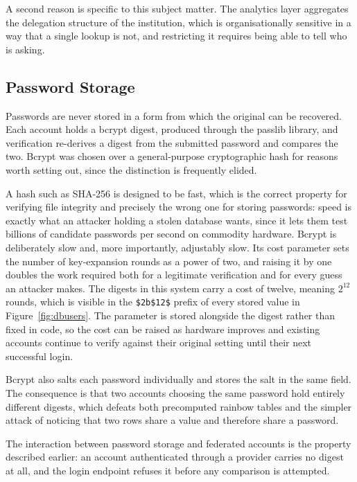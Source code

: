 A second reason is specific to this subject matter. The analytics layer aggregates the
delegation structure of the institution, which is organisationally sensitive in a way that a
single lookup is not, and restricting it requires being able to tell who is asking.

\subsection{Password Storage}

Passwords are never stored in a form from which the original can be recovered. Each account
holds a bcrypt digest, produced through the passlib library, and verification re-derives a
digest from the submitted password and compares the two. Bcrypt was chosen over a
general-purpose cryptographic hash for reasons worth setting out, since the distinction is
frequently elided.

A hash such as SHA-256 is designed to be fast, which is the correct property for verifying
file integrity and precisely the wrong one for storing passwords: speed is exactly what an
attacker holding a stolen database wants, since it lets them test billions of candidate
passwords per second on commodity hardware. Bcrypt is deliberately slow and, more
importantly, adjustably slow. Its cost parameter sets the number of key-expansion rounds as a
power of two, and raising it by one doubles the work required both for a legitimate
verification and for every guess an attacker makes. The digests in this system carry a cost
of twelve, meaning $2^{12}$ rounds, which is visible in the \texttt{\$2b\$12\$} prefix of
every stored value in Figure~\ref{fig:dbusers}. The parameter is stored alongside the digest
rather than fixed in code, so the cost can be raised as hardware improves and existing
accounts continue to verify against their original setting until their next successful login.

Bcrypt also salts each password individually and stores the salt in the same field. The
consequence is that two accounts choosing the same password hold entirely different digests,
which defeats both precomputed rainbow tables and the simpler attack of noticing that two
rows share a value and therefore share a password.

The interaction between password storage and federated accounts is the property described
earlier: an account authenticated through a provider carries no digest at all, and the login
endpoint refuses it before any comparison is attempted.

